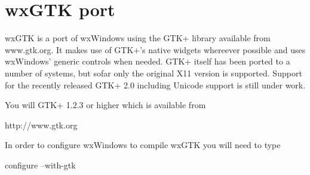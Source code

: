 \section{wxGTK port}\label{wxgtkport}

wxGTK is a port of wxWindows using the GTK+ library available
from www.gtk.org. It makes use of GTK+'s native widgets whereever
possible and uses wxWindows' generic controls when needed. GTK+
itself has been ported to a number of systems, but sofar only the
original X11 version is supported. Support for the recently released
GTK+ 2.0 including Unicode support is still under work.

You will GTK+ 1.2.3 or higher which is available from

  http://www.gtk.org
  
In order to configure wxWindows to compile wxGTK you will 
need to type

  configure --with-gtk


